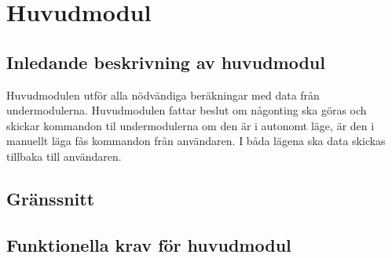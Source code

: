 \section{Huvudmodul}

\subsection{Inledande beskrivning av huvudmodul}
Huvudmodulen utför alla nödvändiga beräkningar med data från undermodulerna. Huvudmodulen fattar beslut om någonting ska göras och skickar kommandon til undermodulerna om den är i autonomt läge, är den i manuellt läga fås kommandon från användaren. I båda lägena ska data skickas tillbaka till användaren.

\subsection{Gränssnitt}
\begin{LIPSkravlista}
\end{LIPSkravlista}

\subsection{Funktionella krav för huvudmodul}	
\begin{LIPSkravlista}
\end{LIPSkravlista}